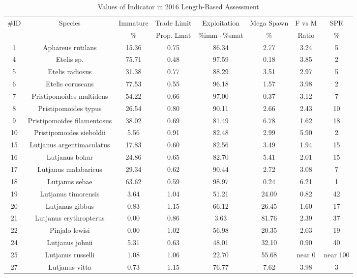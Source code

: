 \documentclass{report}\usepackage[]{graphicx}\usepackage[]{color}
\begin{document}
\begin{table}[ht]
\centering
\caption{Values of Indicator in 2016 Length-Based Assessment} 
{\small
\begin{tabular}{cccccccc}
  \hline
\#ID & Species & Immature & Trade Limit & Exploitation & Mega Spawn & F vs M & SPR \\ 
  {} & {} & {\%} & {Prop. Lmat} & {\%imm+\%smat} & {\%} & {Ratio} & {\%} \\ \hline
  1 & Aphareus rutilans & 15.36 & 0.75 & 86.34 & 2.77 & 3.24 & 5 \\ 
    4 & Etelis sp. & 75.71 & 0.48 & 97.59 & 0.18 & 3.85 & 2 \\ 
    5 & Etelis radiosus & 31.38 & 0.77 & 88.29 & 3.51 & 2.97 & 5 \\ 
    6 & Etelis coruscans & 77.53 & 0.55 & 96.18 & 1.57 & 3.98 & 2 \\ 
    7 & Pristipomoides multidens & 54.22 & 0.66 & 97.00 & 0.37 & 3.12 & 7 \\ 
    8 & Pristipomoides typus & 26.54 & 0.80 & 90.11 & 2.66 & 2.43 & 10 \\ 
    9 & Pristipomoides filamentosus & 38.02 & 0.69 & 81.49 & 6.78 & 1.62 & 18 \\ 
   10 & Pristipomoides sieboldii & 5.56 & 0.91 & 82.48 & 2.99 & 5.90 & 2 \\ 
   15 & Lutjanus argentimaculatus & 17.83 & 0.60 & 82.56 & 3.49 & 1.94 & 15 \\ 
   16 & Lutjanus bohar & 24.86 & 0.65 & 82.70 & 5.41 & 2.01 & 15 \\ 
   17 & Lutjanus malabaricus & 29.34 & 0.62 & 90.44 & 2.72 & 3.08 & 7 \\ 
   18 & Lutjanus sebae & 63.62 & 0.59 & 98.97 & 0.24 & 6.21 & 1 \\ 
   19 & Lutjanus timorensis & 3.64 & 1.04 & 51.21 & 24.09 & 0.82 & 42 \\ 
   20 & Lutjanus gibbus & 0.83 & 1.15 & 66.12 & 26.45 & 1.60 & 17 \\ 
   21 & Lutjanus erythropterus & 0.00 & 0.86 & 3.63 & 81.76 & 2.39 & 37 \\ 
   22 & Pinjalo lewisi & 0.00 & 1.02 & 56.98 & 20.35 & 2.03 & 19 \\ 
   24 & Lutjanus johnii & 5.31 & 0.63 & 48.01 & 32.10 & 0.90 & 40 \\ 
   25 & Lutjanus russelli & 1.08 & 1.06 & 22.70 & 55.68 & near 0 & near 100 \\ 
   27 & Lutjanus vitta & 0.73 & 1.15 & 76.77 & 7.62 & 3.98 & 3 \\ 

\end{tabular}}
\end{table}
\end{document}
